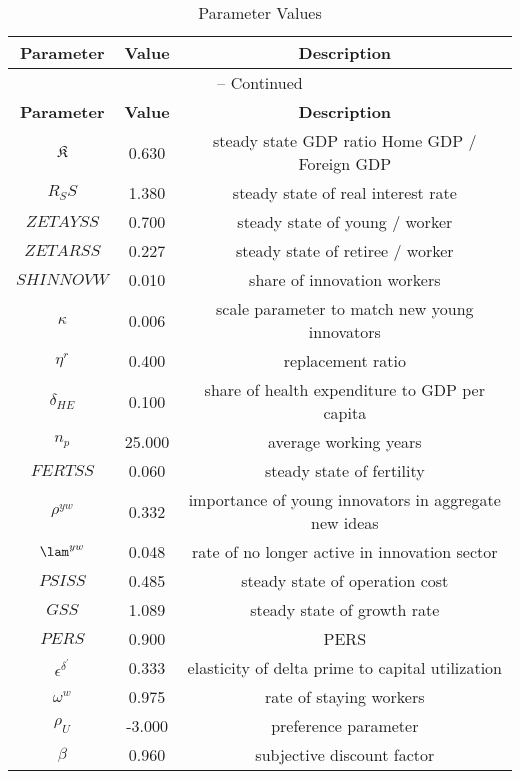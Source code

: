 \begin{center}
\begin{longtable}{ccc}
\caption{Parameter Values}\\%
\toprule%
\multicolumn{1}{c}{\textbf{Parameter}} &
\multicolumn{1}{c}{\textbf{Value}} &
 \multicolumn{1}{c}{\textbf{Description}}\\%
\midrule%
\endfirsthead
\multicolumn{3}{c}{{\tablename} \thetable{} -- Continued}\\%
\midrule%
\multicolumn{1}{c}{\textbf{Parameter}} &
\multicolumn{1}{c}{\textbf{Value}} &
  \multicolumn{1}{c}{\textbf{Description}}\\%
\midrule%
\endhead
${\mathfrak{K}}$ 	 & 	 0.630 	 & 	 steady state GDP ratio \: Home GDP / Foreign GDP \\
${R_SS}$ 	 & 	 1.380 	 & 	 steady state of real interest rate\\
${ZETAYSS}$ 	 & 	 0.700 	 & 	 steady state of young / worker \\
${ZETARSS}$ 	 & 	 0.227 	 & 	 steady state of retiree / worker \\
${SHINNOVW}$ 	 & 	 0.010 	 & 	 share of innovation workers\\
${\kappa}$ 	 & 	 0.006 	 & 	 scale parameter to match new young innovators\\
${\eta^r}$ 	 & 	 0.400 	 & 	 replacement ratio\\
${\delta_{HE}}$ 	 & 	 0.100 	 & 	 share of health expenditure to GDP per capita\\
${n_p}$ 	 & 	 25.000 	 & 	 average working years\\
${FERTSS}$ 	 & 	 0.060 	 & 	 steady state of fertility\\
${\rho^{yw}}$ 	 & 	 0.332 	 & 	 importance of young innovators in aggregate new ideas\\
${\lam^{yw}}$ 	 & 	 0.048 	 & 	 rate of no longer active in innovation sector\\
${PSISS}$ 	 & 	 0.485 	 & 	 steady state of operation cost\\
${GSS}$ 	 & 	 1.089 	 & 	 steady state of growth rate\\
$PERS$ 	 & 	 0.900 	 & 	 PERS\\
${\epsilon^{\delta^{\prime}}}$ 	 & 	 0.333 	 & 	 elasticity of delta prime to capital utilization\\
${\omega^w}$ 	 & 	 0.975 	 & 	 rate of staying workers\\
${\rho_U}$ 	 & 	 -3.000 	 & 	 preference parameter\\
${\beta}$ 	 & 	 0.960 	 & 	 subjective discount factor\\

\end{longtable}
\end{center}
